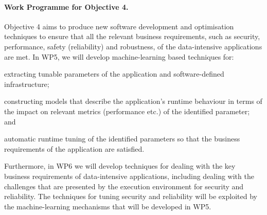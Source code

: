 \documentclass[a4paper,11pt]{article}
\begin{document}
\paragraph*{Work Programme for Objective 4.}
Objective 4 aims to produce new software development and optimisation techniques to ensure that all the relevant
business requirements, such as security, performance, safety (reliability) and robustness, of the data-intensive 
applications are met. In WP5, we will develop machine-learning based techniques for:
\begin{inparaenum}[i)]
\item
extracting 
tunable parameters of the application and software-defined infrastructure; 
\item
constructing models that
describe the application's runtime behaviour in terms of the impact on relevant metrics (performance etc.)
of the identified parameter; and
\item
automatic runtime tuning of the identified parameters so that the
business requirements of the application are satisfied. 
\end{inparaenum}
Furthermore, in WP6 we will develop techniques for
dealing with the key business requirements of  data-intensive applications,
including dealing with the challenges that are presented by the execution environment for 
security and reliability. The techniques for tuning security and reliability will be exploited by the 
machine-learning mechanisms that will be developed in WP5.

\end{document}
